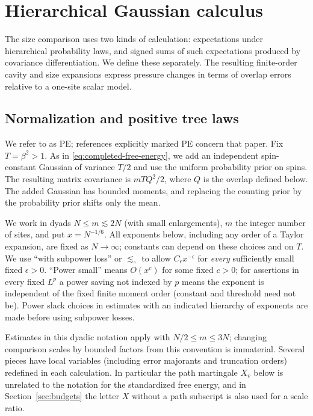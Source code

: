\section{Hierarchical Gaussian calculus}
\label{sec:foundations}

The size comparison uses two kinds of calculation: expectations under
hierarchical probability laws, and signed sums of such expectations produced
by covariance differentiation. We define these separately. The resulting
finite-order cavity and size expansions express pressure changes in terms
of overlap errors relative to a one-site scalar model.

\subsection{Normalization and positive tree laws}

We refer to \cite{PE} as PE; references explicitly marked PE concern that
paper. Fix \(T=\beta^2>1\). As in \eqref{eq:completed-free-energy}, we
add an independent spin-constant Gaussian of variance \(T/2\) and use the
uniform probability prior on spins. The resulting matrix covariance is
\(mTQ^2/2\), where \(Q\) is the overlap defined below. The added Gaussian
has bounded moments, and replacing the counting prior by the probability
prior shifts only the mean.

We work in dyads \(N\le m\lesssim 2N\) (with small enlargements), \(m\) the integer number of sites, and put \(x=N^{-1/6}\). All exponents below, including any order of a Taylor expansion, are fixed as \(N\to\infty\); constants can depend on these choices and on \(T\). We use ``with subpower loss'' or \(\lesssim_\circ\) to allow \(C_\epsilon x^{-\epsilon}\) for \emph{every} sufficiently small fixed \(\epsilon>0\). ``Power small'' means \(O(x^c)\) for some fixed \(c>0\); for assertions in every fixed \(L^p\) a power saving not indexed by \(p\) means the exponent is independent of the fixed finite moment order (constant and threshold need not be). Power slack choices in estimates with an indicated hierarchy of exponents are made before using subpower losses.

Estimates in this dyadic notation apply with \(N/2\le m\le3N\); changing comparison scales by bounded factors from this convention is immaterial. Several pieces have local variables (including error majorants and truncation orders) redefined in each calculation. In particular the path martingale \(X_v\) below is unrelated to the notation for the standardized free energy, and in Section~\ref{sec:budgets} the letter \(X\) without a path subscript is also used for a scale ratio.

